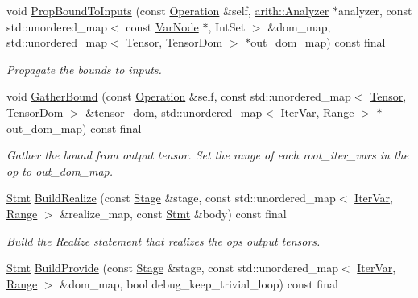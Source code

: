 \begin{DoxyCompactItemize}
void \hyperlink{classtvm_1_1te_1_1PlaceholderOpNode_aa7c4daa391954629cbc0eb9d91ed0ed3}{Prop\+Bound\+To\+Inputs} (const \hyperlink{classtvm_1_1te_1_1Operation}{Operation} \&self, \hyperlink{classtvm_1_1arith_1_1Analyzer}{arith\+::\+Analyzer} $\ast$analyzer, const std\+::unordered\+\_\+map$<$ const \hyperlink{classtvm_1_1tir_1_1VarNode}{Var\+Node} $\ast$, Int\+Set $>$ \&dom\+\_\+map, std\+::unordered\+\_\+map$<$ \hyperlink{classtvm_1_1te_1_1Tensor}{Tensor}, \hyperlink{structtvm_1_1te_1_1TensorDom}{Tensor\+Dom} $>$ $\ast$out\+\_\+dom\+\_\+map) const final
\begin{DoxyCompactList}\small\item\em Propagate the bounds to inputs. \end{DoxyCompactList}\item 
void \hyperlink{classtvm_1_1te_1_1PlaceholderOpNode_ab4e1418bc5187cad2710bc5156e3ac5b}{Gather\+Bound} (const \hyperlink{classtvm_1_1te_1_1Operation}{Operation} \&self, const std\+::unordered\+\_\+map$<$ \hyperlink{classtvm_1_1te_1_1Tensor}{Tensor}, \hyperlink{structtvm_1_1te_1_1TensorDom}{Tensor\+Dom} $>$ \&tensor\+\_\+dom, std\+::unordered\+\_\+map$<$ \hyperlink{classtvm_1_1tir_1_1IterVar}{Iter\+Var}, \hyperlink{classtvm_1_1Range}{Range} $>$ $\ast$out\+\_\+dom\+\_\+map) const final
\begin{DoxyCompactList}\small\item\em Gather the bound from output tensor. Set the range of each root\+\_\+iter\+\_\+vars in the op to out\+\_\+dom\+\_\+map. \end{DoxyCompactList}\item 
\hyperlink{classtvm_1_1tir_1_1Stmt}{Stmt} \hyperlink{classtvm_1_1te_1_1PlaceholderOpNode_a524d658c650915abff3a2388b9c3d0c5}{Build\+Realize} (const \hyperlink{classtvm_1_1te_1_1Stage}{Stage} \&stage, const std\+::unordered\+\_\+map$<$ \hyperlink{classtvm_1_1tir_1_1IterVar}{Iter\+Var}, \hyperlink{classtvm_1_1Range}{Range} $>$ \&realize\+\_\+map, const \hyperlink{classtvm_1_1tir_1_1Stmt}{Stmt} \&body) const final
\begin{DoxyCompactList}\small\item\em Build the Realize statement that realizes the op\textquotesingle{}s output tensors. \end{DoxyCompactList}\item 
\hyperlink{classtvm_1_1tir_1_1Stmt}{Stmt} \hyperlink{classtvm_1_1te_1_1PlaceholderOpNode_a3571782a91faade829f9b11a5893cba1}{Build\+Provide} (const \hyperlink{classtvm_1_1te_1_1Stage}{Stage} \&stage, const std\+::unordered\+\_\+map$<$ \hyperlink{classtvm_1_1tir_1_1IterVar}{Iter\+Var}, \hyperlink{classtvm_1_1Range}{Range} $>$ \&dom\+\_\+map, bool debug\+\_\+keep\+\_\+trivial\+\_\+loop) const final

\end{DoxyCompactItemize}
